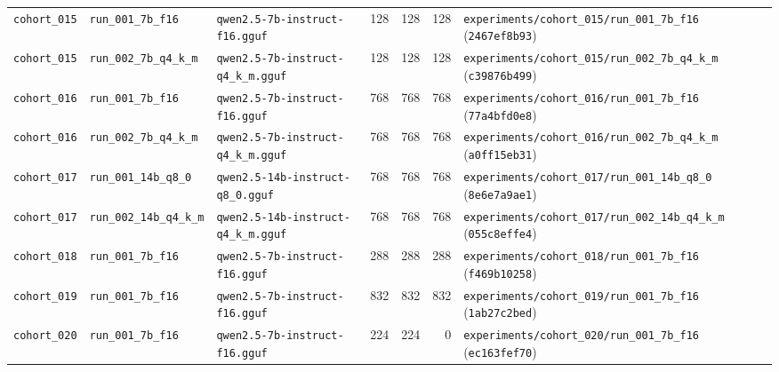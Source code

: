 {\begin{longtable}{@{}>{\raggedright\arraybackslash}p{1.5cm}>{\raggedright\arraybackslash}p{2.7cm}>{\raggedright\arraybackslash}p{3.2cm}rrr>{\raggedright\arraybackslash}p{4.2cm}@{}}
\texttt{cohort\_015} & \texttt{run\_001\_7b\_f16} & \texttt{qwen2.5-\allowbreak{}7b-\allowbreak{}instruct-\allowbreak{}f16.gguf} & 128 & 128 & 128 & \texttt{experiments/\allowbreak{}cohort\_015/\allowbreak{}run\_001\_7b\_f16} (\texttt{2467ef8b93}) \\
\texttt{cohort\_015} & \texttt{run\_002\_7b\_q4\_k\_m} & \texttt{qwen2.5-\allowbreak{}7b-\allowbreak{}instruct-\allowbreak{}q4\_k\_m.gguf} & 128 & 128 & 128 & \texttt{experiments/\allowbreak{}cohort\_015/\allowbreak{}run\_002\_7b\_q4\_k\_m} (\texttt{c39876b499}) \\
\texttt{cohort\_016} & \texttt{run\_001\_7b\_f16} & \texttt{qwen2.5-\allowbreak{}7b-\allowbreak{}instruct-\allowbreak{}f16.gguf} & 768 & 768 & 768 & \texttt{experiments/\allowbreak{}cohort\_016/\allowbreak{}run\_001\_7b\_f16} (\texttt{77a4bfd0e8}) \\
\texttt{cohort\_016} & \texttt{run\_002\_7b\_q4\_k\_m} & \texttt{qwen2.5-\allowbreak{}7b-\allowbreak{}instruct-\allowbreak{}q4\_k\_m.gguf} & 768 & 768 & 768 & \texttt{experiments/\allowbreak{}cohort\_016/\allowbreak{}run\_002\_7b\_q4\_k\_m} (\texttt{a0ff15eb31}) \\
\texttt{cohort\_017} & \texttt{run\_001\_14b\_q8\_0} & \texttt{qwen2.5-\allowbreak{}14b-\allowbreak{}instruct-\allowbreak{}q8\_0.gguf} & 768 & 768 & 768 & \texttt{experiments/\allowbreak{}cohort\_017/\allowbreak{}run\_001\_14b\_q8\_0} (\texttt{8e6e7a9ae1}) \\
\texttt{cohort\_017} & \texttt{run\_002\_14b\_q4\_k\_m} & \texttt{qwen2.5-\allowbreak{}14b-\allowbreak{}instruct-\allowbreak{}q4\_k\_m.gguf} & 768 & 768 & 768 & \texttt{experiments/\allowbreak{}cohort\_017/\allowbreak{}run\_002\_14b\_q4\_k\_m} (\texttt{055c8effe4}) \\
\texttt{cohort\_018} & \texttt{run\_001\_7b\_f16} & \texttt{qwen2.5-\allowbreak{}7b-\allowbreak{}instruct-\allowbreak{}f16.gguf} & 288 & 288 & 288 & \texttt{experiments/\allowbreak{}cohort\_018/\allowbreak{}run\_001\_7b\_f16} (\texttt{f469b10258}) \\
\texttt{cohort\_019} & \texttt{run\_001\_7b\_f16} & \texttt{qwen2.5-\allowbreak{}7b-\allowbreak{}instruct-\allowbreak{}f16.gguf} & 832 & 832 & 832 & \texttt{experiments/\allowbreak{}cohort\_019/\allowbreak{}run\_001\_7b\_f16} (\texttt{1ab27c2bed}) \\
\texttt{cohort\_020} & \texttt{run\_001\_7b\_f16} & \texttt{qwen2.5-\allowbreak{}7b-\allowbreak{}instruct-\allowbreak{}f16.gguf} & 224 & 224 & 0 & \texttt{experiments/\allowbreak{}cohort\_020/\allowbreak{}run\_001\_7b\_f16} (\texttt{ec163fef70}) \\

\end{longtable}}
